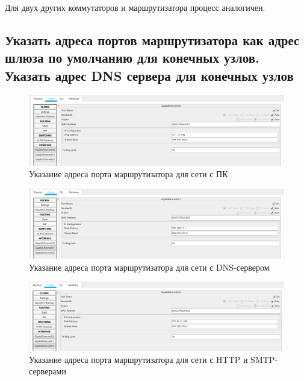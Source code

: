 \documentclass[12pt]{report}
\begin{document}
Для двух других коммутаторов и маршрутизатора процесс аналогичен.

\subsection*{Указать адреса портов маршрутизатора как адрес шлюза по умолчанию для конечных узлов. Указать адрес DNS сервера для конечных узлов}

\begin{figure}[H]
	\begin{center}
		\includegraphics[scale=0.4]{img/3.png}
	\end{center}
	\caption{Указание адреса порта маршрутизатора для сети с ПК}
	\label{fig:3}
\end{figure}

\begin{figure}[H]
	\begin{center}
		\includegraphics[scale=0.4]{img/4.png}
	\end{center}
	\caption{Указание адреса порта маршрутизатора для сети с DNS-сервером}
	\label{fig:4}
\end{figure}

\begin{figure}[H]
	\begin{center}
		\includegraphics[scale=0.4]{img/5.png}
	\end{center}
	\caption{Указание адреса порта маршрутизатора для сети с HTTP и SMTP-серверами}
	\label{fig:5}
\end{figure}
\end{document}
